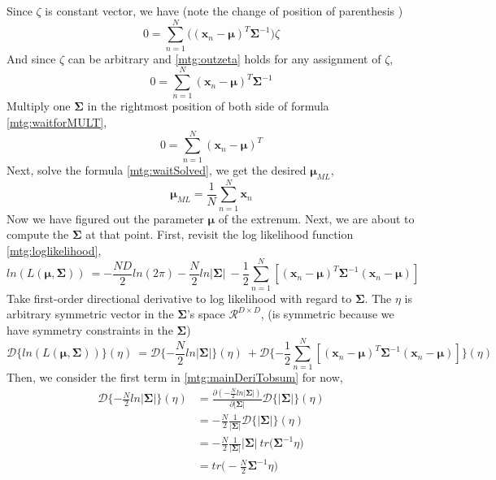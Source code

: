 \documentclass[11pt,a4paper]{article}
\newcommand{\htab}{\hspace*{0.63cm}}
\newcommand{\dd}[2]{\mathcal{D}\{ #1 \} (#2)}
\newcommand{\bmu}{\boldsymbol{\mu}}
\newcommand{\bsum}{\boldsymbol{\Sigma}}
\newcommand{\xnv}{\boldsymbol{x}_{n} }
\begin{document}
\htab Since $\zeta$ is constant vector, we have (note the change of position of parenthesis )
    \begin{equation} \label{mtg:outzeta}
        0 = \sum_{n=1}^{N}{ \Big( (\xnv-\bmu)^{T} \bsum^{-1}  \Big) \zeta }
    \end{equation}
\htab And since $\zeta$ can be arbitrary and \eqref{mtg:outzeta} holds for any assignment of $\zeta$, 
    \begin{equation} \label{mtg:waitforMULT}
        0 = \sum_{n=1}^{N}{  (\xnv-\bmu)^{T} \bsum^{-1} }
    \end{equation}
\htab Multiply one $\bsum$ in the rightmost position of both side of formula \eqref{mtg:waitforMULT}, 
    \begin{equation} \label{mtg:waitSolved}
        0 = \sum_{n=1}^{N}{  (\xnv-\bmu)^{T} }
    \end{equation}
\htab Next, solve the formula \eqref{mtg:waitSolved}, we get the desired $\bmu_{ML}$,
    \begin{equation} \label{mtg:muML} \bmu_{ML} = \frac{1}{N} \sum_{n=1}^{N} \xnv  \end{equation}
\htab Now we have figured out the parameter $\bmu$ of the extrenum. Next, we are about to compute the $\bsum$ at that point. First, revisit the log likelihood function \eqref{mtg:loglikelihood},
    \begin{equation}  
    ln(L(\bmu,\bsum)) \
    = -\frac{ND}{2}ln(2\pi) - \frac{N}{2} ln|\bsum| \ 
        -\frac{1}{2} \sum_{n=1}^{N} [ (\xnv-\bmu)^{T} \bsum^{-1} (\xnv-\bmu)] \ 
    \end{equation}
    \htab Take first-order directional derivative to log likelihood with regard to $\bsum$. The $\eta$ is arbitrary symmetric vector in the $\bsum$'s space $\mathcal{R}^{D\times D}$, (\eta is symmetric because we have symmetry constraints in the $\bsum$)
    \begin{equation} \label{mtg:mainDeriTobsum}
        \dd{ln(L(\bmu,\bsum))}{\eta} \
        = \dd{- \frac{N}{2} ln|\bsum|}{\eta} \ 
        + \dd{-\frac{1}{2} \sum_{n=1}^{N} [ (\xnv-\bmu)^{T} \bsum^{-1} (\xnv-\bmu)]}{\eta} \ 
    \end{equation}
\htab Then, we consider the first term in \eqref{mtg:mainDeriTobsum} for now,
        \begin{align}
            \dd{- \frac{N}{2} ln|\bsum|}{\eta} 
            & = \frac{\partial (-\frac{N}{2} ln|\bsum|)}{\partial |\bsum|} \dd{|\bsum|}{\eta} \\
            & = - \frac{N}{2} \frac{1}{|\bsum|} \dd{|\bsum|}{\eta} \\
            & = - \frac{N}{2} \frac{1}{|\bsum|} |\bsum|\ tr \big(\bsum^{-1} \eta\big) \\
            & =  tr \big(-\frac{N}{2} \bsum^{-1} \eta\big) \label{mtg:firstterm}
        \end{align}
\end{document}
